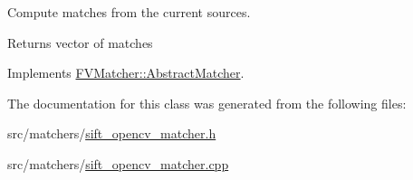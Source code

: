 Compute matches from the current sources. 

\begin{DoxyReturn}{Returns}
vector of matches 
\end{DoxyReturn}


Implements \hyperlink{classFVMatcher_1_1AbstractMatcher_a201dc53542e0d9a10a08f8418b55d20a}{F\+V\+Matcher\+::\+Abstract\+Matcher}.



The documentation for this class was generated from the following files\+:\begin{DoxyCompactItemize}
\item 
src/matchers/\hyperlink{sift__opencv__matcher_8h}{sift\+\_\+opencv\+\_\+matcher.\+h}\item 
src/matchers/\hyperlink{sift__opencv__matcher_8cpp}{sift\+\_\+opencv\+\_\+matcher.\+cpp}\end{DoxyCompactItemize}

